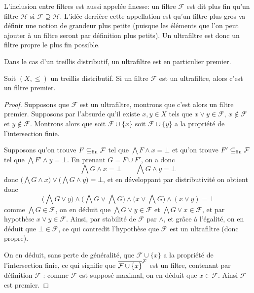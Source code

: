 \begin{remark}
  L'inclusion entre filtres est aussi appelée \og finesse\fg : un filtre
  $\mathcal F$ est dit plus fin qu'un filtre $\mathcal H$ si
  $\mathcal F\supseteq\mathcal H$. L'idée derrière cette appellation est qu'un
  filtre plus gros va définir une notion de grandeur plus petite (puisque les
  éléments que l'on peut ajouter à un filtre seront par définition plus petits).
  Un ultrafiltre est donc un filtre propre le plus fin possible.
\end{remark}

Dans le cas d'un treillis distributif, un ultrafiltre est en particulier
premier.

\begin{proposition}
  Soit $(X,\leq)$ un treillis distributif. Si un filtre $\mathcal F$ est un
  ultrafiltre, alors c'est un filtre premier.
\end{proposition}

\begin{proof}
  Supposons que $\mathcal F$ est un ultrafiltre, montrons que c'est alors un
  filtre premier. Supposons par l'absurde qu'il existe $x,y\in X$ tels que
  $x\lor y \in \mathcal F$, $x\notin\mathcal F$ et $y\notin\mathcal F$.
  Montrons alors que soit $\mathcal F\cup\{x\}$ soit $\mathcal F\cup\{y\}$ a la
  propriété de l'intersection finie.

  Supposons qu'on trouve $F\subseteq_{\mathrm{fin}} \mathcal F$ tel que
  $\bigwedge F \land x =\bot$ et qu'on trouve $F'\subseteq_{\mathrm{fin}}\mathcal F$ tel que
  $\bigwedge F' \land y = \bot$. En prenant $G = F \cup F'$, on a donc
  \[\bigwedge G \land x = \bot \qquad \bigwedge G \land y = \bot\]
  donc $\big(\bigwedge G \land x\big)\lor\big(\bigwedge G\land y\big) = \bot$,
  et en développant par distributivité on obtient donc
  \[\Bigg(\bigwedge G \lor y\Bigg)\land\Bigg(\bigwedge G\lor \bigwedge G\Bigg)
  \land \Bigg(x\lor \bigwedge G\Bigg)\land(x\lor y) = \bot\]
  comme $\bigwedge G\in \mathcal F$, on en déduit que
  $\bigwedge G \lor y \in \mathcal F$ et $\bigwedge G \lor x \in \mathcal F$,
  et par hypothèse $x\lor y \in \mathcal F$. Ainsi, par stabilité de
  $\mathcal F$ par $\land$, et grâce à l'égalité, on en déduit que
  $\bot\in\mathcal F$, ce qui contredit l'hypothèse que $\mathcal F$ est un
  ultrafiltre (donc propre).

  On en déduit, sans perte de généralité, que $\mathcal F\cup\{x\}$ a la
  propriété de l'intersection finie, ce qui signifie que
  $\overline{\mathcal F\cup\{x\}}^{\mathcal F}$ est un filtre, contenant par définition
  $\mathcal F$ : comme $\mathcal F$ est supposé maximal, on en déduit que
  $x\in \mathcal F$. Ainsi $\mathcal F$ est premier.
\end{proof}

